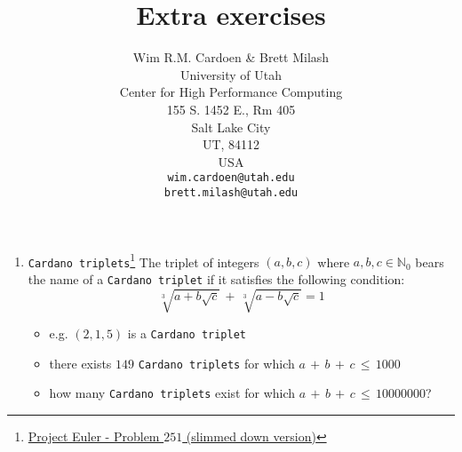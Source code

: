 \documentclass[10pt]{article}
\begin{document}
\title{Extra exercises}
\author{Wim R.M. Cardoen \& Brett Milash\\
        University of Utah\\
        Center for High Performance Computing\\
        155 S. 1452 E., Rm 405\\
        Salt Lake City\\
        UT, 84112\\
        USA\\
        \texttt{wim.cardoen@utah.edu}\\
	\texttt{brett.milash@utah.edu}}
\renewcommand{\today}{February 18, 2024}
\renewcommand{\labelitemii}{$\star$}
\maketitle

\begin{enumerate}
	\item \texttt{Cardano triplets}\footnote{\href{https://www.projecteuler.net/problem=251}{Project Euler - Problem $251$ (slimmed down version)}}\newline
  	 The triplet of integers $(a,b,c)$ where $a,b,c \in \mathbb{N}_0$ bears the name 
         of a \texttt{Cardano triplet} if it satisfies the following condition:
  	 \begin{equation}
  	    \displaystyle \sqrt[3]{a+b\sqrt{c}}\,+\, \sqrt[3]{a-b\sqrt{c}}   =   1 \nonumber
	 \end{equation}		
         \begin{itemize}
            \item e.g. $(2,1,5)$ is a \texttt{Cardano triplet}
            \item there exists $149$ \texttt{Cardano triplets} for which $a\,+\,b\,+\,c\,\le\,1000$
            \item how many \texttt{Cardano triplets} exist for which $a\,+\,b\,+\,c\,\le\,10000000$?
         \end{itemize}			 
\end{enumerate}
\renewcommand \thesection{\Roman{section}}
\end{document}
